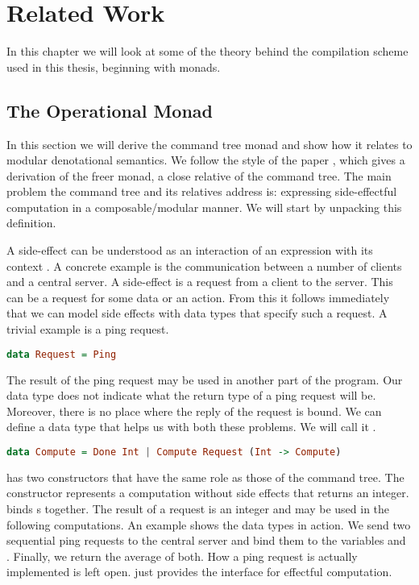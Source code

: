 
\chapter{\label{chap:related-work}Related Work}
In this chapter we will look at some of the theory behind the compilation scheme used in this thesis, beginning with monads.

\section{\label{section:opmonad}The Operational Monad}
In this section we will derive the command tree monad and show how it relates to modular denotational semantics. We follow the style of the paper  \autocite{DBLP:conf/haskell/KiselyovI15}, which gives a derivation of the freer monad, a close relative of the command tree. The main problem the command tree and its relatives address is: expressing side-effectful computation in a composable/modular manner. We will start by unpacking this definition.

A side-effect can be understood as an interaction of an expression with its context \autocite{DBLP:conf/tacs/CartwrightF94}. A concrete example is the communication between a number of clients and a central server. A side-effect is a request from a client to the server. This can be a request for some data or an action. From this it follows immediately that we can model side effects with data types that specify such a request. A trivial example is a ping request.

\begin{lstlisting}[language=Haskell]
data Request = Ping
\end{lstlisting}

The result of the ping request may be used in another part of the program. Our  data type does not indicate what the return type of a ping request will be. Moreover, there is no place where the reply of the request is bound. We can define a data type that helps us with both these problems. We will call it .

\begin{lstlisting}[language=Haskell]
data Compute = Done Int | Compute Request (Int -> Compute)
\end{lstlisting}

 has two constructors that have the same role as those of the command tree. The  constructor represents a computation without side effects that returns an integer.  binds s together. The result of a request is an integer and may be used in the following computations. An example shows the data types in action. We send two sequential ping requests to the central server and bind them to the variables  and . Finally, we return the average of both. How a ping request is actually implemented is left open.  just provides the interface for effectful computation.

